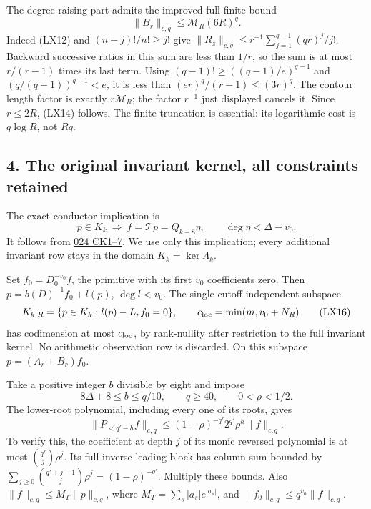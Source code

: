 \documentclass[10pt]{article}
\begin{document}
The degree-raising part admits the improved full finite bound \[
\boxed{\|B_r\|_{c,q}\le\mathcal M_R(6R)^q.}
\tag{LX14}
\] Indeed (LX12) and \((n+j)!/n!\ge j!\) give \(\|R_z\|_{c,q}\le r^{-1}\sum_{j=1}^{q-1}(qr)^j/j!\). Backward successive ratios in this sum are less than \(1/r\), so the sum is at most \(r/(r-1)\) times its last term. Using \((q-1)!\ge((q-1)/e)^{q-1}\) and \((q/(q-1))^{q-1}<e\), it is less than \((er)^q/(r-1)\le(3r)^q\). The contour length factor is exactly \(r\mathcal M_R\); the factor \(r^{-1}\) just displayed cancels it. Since \(r\le2R\), (LX14) follows. The finite truncation is essential: its logarithmic cost is \(q\log R\), not \(Rq\).

\subsection{4. The original invariant kernel, all constraints retained}\label{the-original-invariant-kernel-all-constraints-retained}

The exact conductor implication is \[
p\in K_k\ \Longrightarrow\ f=\mathcal Tp=Q_{k-8}\eta,
\qquad\deg\eta<\Delta-v_0.
\tag{LX15}
\] It follows from \href{https://github.com/KokunoYumeto/zeta-function-research-reader/blob/1447462732b40b1474bd9a819cf79257f5326ada/workbenches/splitzero-tandem/continuations/20260922-kernel-frequency/COMBINED_KERNEL_AND_RECEIVERS.md\#L6}{024 CK1--7}. We use only this implication; every additional invariant row stays in the domain \(K_k=\ker\Lambda_k\).

Set \(f_0=D_0^{-v_0}f\), the primitive with its first \(v_0\) coefficients zero. Then \(p=b(D)^{-1}f_0+l(p)\), \(\deg l<v_0\). The single cutoff-independent subspace \[
K_{k,R}=\{p\in K_k:l(p)-L_rf_0=0\},\qquad
c_{\rm loc}=\min(m,v_0+N_R)
\tag{LX16}
\] has codimension at most \(c_{\rm loc}\), by rank-nullity after restriction to the full invariant kernel. No arithmetic observation row is discarded. On this subspace \(p=(A_r+B_r)f_0\).

Take a positive integer \(b\) divisible by eight and impose \[
8\Delta+8\le b\le q/10,\qquad q\ge40,\qquad0<\rho<1/2.
\tag{LX17}
\] The lower-root polynomial, including every one of its roots, gives \[
\|P_{<q'-h}f\|_{c,q}\le(1-\rho)^{-q'}2^{q'}\rho^h\|f\|_{c,q}.
\tag{LX18}
\] To verify this, the coefficient at depth \(j\) of its monic reversed polynomial is at most \(\binom{q'}j\rho^j\). Its full inverse leading block has column sum bounded by \(\sum_{j\ge0}\binom{q'+j-1}j\rho^j=(1-\rho)^{-q'}\). Multiply these bounds. Also \(\|f\|_{c,q}\le M_T\|p\|_{c,q}\), where \(M_T=\sum_s|a_s|e^{|\sigma_s|}\), and \(\|f_0\|_{c,q}\le q^{v_0}\|f\|_{c,q}\).
\end{document}
